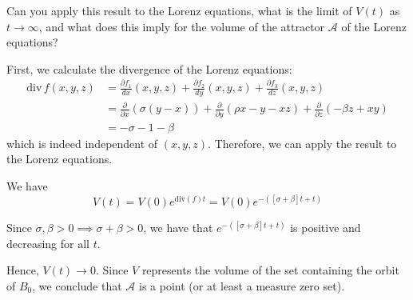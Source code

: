 \documentclass[12pt]{article}
\begin{document}
Can you apply this result to the Lorenz equations, what is the limit of $V(t)$ as $t\to\infty$, and what does this imply for the volume of the attractor $\mathcal{A}$ of the Lorenz equations?

\color{blue}
First, we calculate the divergence of the Lorenz equations:
\begin{align*}
    \mathrm{div}\, f(x,y,z) & = \frac{\partial f_1}{d x}(x,y,z) + \frac{\partial f_2}{d y}(x,y,z) + \frac{\partial f_3}{d z}(x,y,z)                                           \\
                            & = \frac{\partial }{\partial x} (\sigma (y - x)) + \frac{\partial }{\partial y} (\rho x - y - xz) + \frac{\partial }{\partial z} (-\beta z + xy) \\
                            & = -\sigma - 1 - \beta
\end{align*}
which is indeed independent of $(x,y,z)$. Therefore, we can apply the result to the Lorenz equations.

We have
\[V(t) = V(0) e^{\text{div}(f)t} = V(0)e^{-([\sigma + \beta] t + t)}\]

Since $\sigma, \beta>0 \implies \sigma + \beta > 0$, we have that $e^{-([\sigma + \beta] t + t)}$ is positive and decreasing for all $t$.

Hence, $V(t) \to 0$. Since $V$ represents the volume of the set containing the orbit of $B_0$, we conclude that $\mathcal A$ is a point (or at least a measure zero set).
\color{black}
\end{document}
